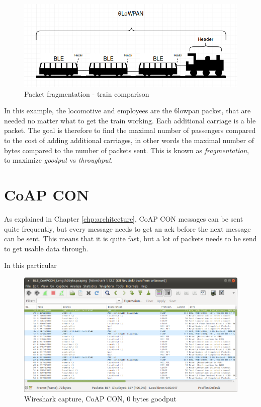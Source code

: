 \begin{figure}[ht]
    \centering
    \includegraphics[scale=0.5]{trainExample.png}    
    \caption{Packet fragmentation - train comparison}
    \label{fig:trainExample}
\end{figure}

In this example, the locomotive and employees are the \gls{6lowpan} packet, that are needed no matter what to get the train working. Each additional carriage is a \gls{ble} packet. The goal is therefore to find the maximal number of passengers compared to the cost of adding additional carriages, in other words the maximal number of bytes compared to the number of packets sent. This is known as \textit{fragmentation}, to maximize \textit{goodput} vs \textit{throughput}. 

\section{CoAP CON}

As explained in Chapter \ref{chp:architecture}, CoAP CON messages can be sent quite frequently, but every message needs to get an \gls{ack} before the next message can be sent. This means that it is quite fast, but a lot of packets needs to be send to get usable data through. 

In this particular 

\begin{figure}[ht]
    \centering
    \includegraphics[width=\textwidth]{wiresharkCoAPCON0byte.png}    
    \caption{Wireshark capture, CoAP CON, 0 bytes goodput}
    \label{fig:coapCON0200}
\end{figure}

